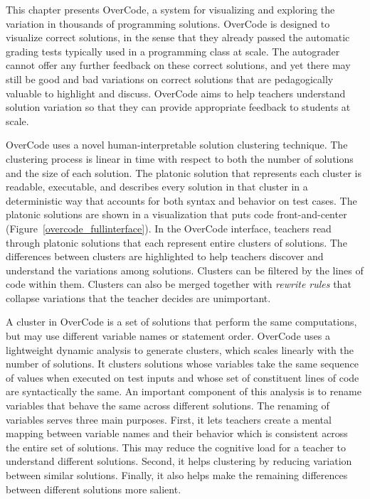 This chapter presents OverCode, a system for visualizing and exploring the variation in thousands of programming solutions. OverCode is designed to visualize correct solutions, in the sense that they already passed the automatic grading tests typically used in a programming class at scale. The autograder cannot offer any further feedback on these correct solutions, and yet there may still be good and bad variations on correct solutions that are pedagogically valuable to highlight and discuss. OverCode aims to help teachers understand solution variation so that they can provide appropriate feedback to students at scale.

OverCode uses a novel human-interpretable solution clustering technique. The clustering process is linear in time with respect to both the number of solutions and the size of each solution. The platonic solution that represents each cluster is readable, executable, and describes every solution in that cluster in a deterministic way that accounts for both syntax and behavior on test cases. The platonic solutions are shown in a visualization that puts code front-and-center (Figure~\ref{overcode_fullinterface}). In the OverCode interface, teachers read through platonic solutions that each represent entire clusters of solutions. The differences between clusters are highlighted to help teachers discover and understand the variations among solutions. Clusters can be filtered by the lines of code within them.  Clusters can also be merged together with {\em rewrite rules} that collapse variations that the teacher decides are unimportant. 

A cluster in OverCode is a set of solutions that perform the same computations, but may use different variable names or statement order.  OverCode uses a lightweight dynamic analysis to generate clusters, which scales linearly with the number of solutions. It clusters solutions whose variables take the same sequence of values when executed on test inputs and whose set of constituent lines of code are syntactically the same. An important component of this analysis is to rename variables that behave the same across different solutions. The renaming of variables serves three main purposes. First, it lets teachers create a mental mapping between variable names and their behavior which is consistent across the entire set of solutions. This may reduce the cognitive load for a teacher to understand different solutions. Second, it helps clustering by reducing variation between similar solutions. Finally, it also helps make the remaining differences between different solutions more salient. 

